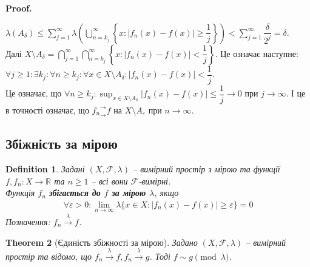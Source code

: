 \documentclass[a4paper, 10pt]{article}
\makeatletter
\theoremstyle{theoremdd}
\newtheorem{theorem}{Theorem}[subsection]
\newtheorem{definition}[theorem]{Definition}
\newcommand\tomeasure[1]{\overset{{#1}}{\to}}
\renewenvironment{proof}[1][Proof.\\]{\par
\pushQED{\hfill \qed}%
\normalfont \topsep6\p@\@plus6\p@\relax
\trivlist
\item\relax
{\bfseries
#1\@addpunct{.}}\hspace\labelsep\ignorespaces
}{%
\popQED\endtrivlist\@endpefalse
}
\makeatother
\begin{document}
\begin{proof}
$\lambda(A_\delta) \leq \displaystyle\sum_{j=1}^\infty \lambda\left( \bigcup_{n=k_j}^\infty \left\{x: |f_n(x)-f(x)| \geq \dfrac{1}{j} \right\} \right) < \sum_{j=1}^\infty \dfrac{\delta}{2^j} = \delta$.\\
Далі $X \setminus A_\delta = \displaystyle\bigcap_{j=1}^\infty \bigcap_{n = k_j}^\infty \left\{x : |f_n(x) - f(x)| < \dfrac{1}{j} \right\}$. Це означає наступне:\\
$\forall j \geq 1: \exists k_j: \forall n \geq k_j: \forall x \in X \setminus A_\delta: |f_n(x)-f(x)| < \dfrac{1}{j}$.\\
Це означає, що $\forall n \geq k_j: \displaystyle\sup_{x \in X \setminus A_\delta} |f_n(x)-f(x)| \leq \dfrac{1}{j} \to 0$ при $j \to \infty$. І це в точності означає, що ${f_n}^\rightarrow_\rightarrow f$ на $X \setminus A_\varepsilon$ при $n \to \infty$.
\end{proof}

\subsection{Збіжність за мірою}
\begin{definition}
Задані $(X,\mathcal{F},\lambda)$ -- вимірний простір з мірою та функції $f,f_n \colon X \to \mathbb{R}$ та $n \geq 1$ -- всі вони $\mathcal{F}$-вимірні.\\
Функція $f_n$ \textbf{збігається до $f$ за мірою $\lambda$}, якщо
\begin{align*}
\forall \varepsilon > 0: \lim_{n \to \infty} \lambda \{ x \in X: |f_n(x) - f(x)| \geq \varepsilon\} = 0
\end{align*}
Позначення: $f_n \tomeasure{\lambda} f$.
\end{definition}

\begin{theorem}[Єдиність збіжності за мірою]
Задано $(X,\mathcal{F},\lambda)$ -- вимірний простір та відомо, що $f_n \tomeasure{\lambda} f, f_n \tomeasure{\lambda} g$. Тоді $f \sim g \pmod \lambda$.
\end{theorem}
\end{document}
